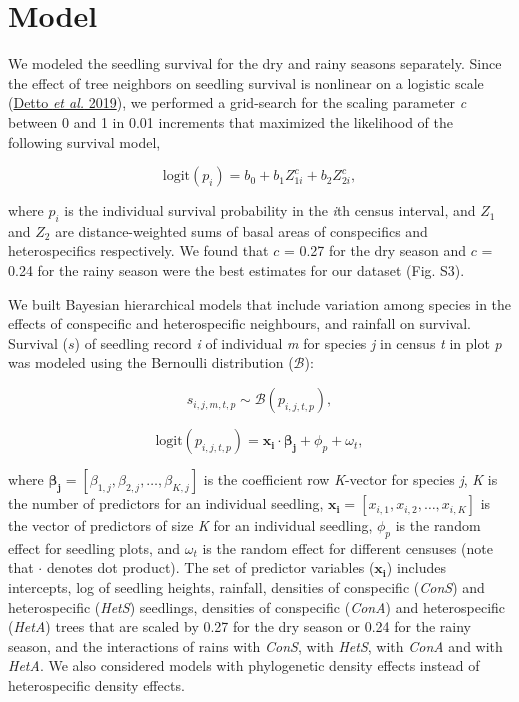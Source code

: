 \documentclass[
  12pt,
  letterpaper,
  DIV=11,
  numbers=noendperiod]{scrartcl}
\author{}
\date{}
\begin{document}
\ifdefined\Shaded\renewenvironment{Shaded}{\begin{tcolorbox}[breakable, interior hidden, borderline west={3pt}{0pt}{shadecolor}, enhanced, sharp corners, boxrule=0pt, frame hidden]}{\end{tcolorbox}}\fi

\hypertarget{model}{%
\section{Model}\label{model}}

We modeled the seedling survival for the dry and rainy seasons
separately. Since the effect of tree neighbors on seedling survival is
nonlinear on a logistic scale (\protect\hyperlink{ref-Detto2019}{Detto
\emph{et al.} 2019}), we performed a grid-search for the scaling
parameter \emph{c} between 0 and 1 in 0.01 increments that maximized the
likelihood of the following survival model,

\[
\mathrm{logit}(p_i) = b_0 + b_1 Z_{1i}^c + b_2 Z_{2i}^c,
\]

where \(p_i\) is the individual survival probability in the \emph{i}th
census interval, and \(Z_1\) and \(Z_2\) are distance-weighted sums of
basal areas of conspecifics and heterospecifics respectively. We found
that \(c\) = 0.27 for the dry season and \(c\) = 0.24 for the rainy
season were the best estimates for our dataset (Fig. S3).

We built Bayesian hierarchical models that include variation among
species in the effects of conspecific and heterospecific neighbours, and
rainfall on survival. Survival (\(s\)) of seedling record \emph{i} of
individual \emph{m} for species \emph{j} in census \emph{t} in plot
\emph{p} was modeled using the Bernoulli distribution (\(\mathcal{B}\)):

\[
s_{i,j,m,t,p} \sim \mathcal{B}(p_{i, j, t, p}),
\]

\[
\mathrm{logit}(p_{i,j,t,p}) = \boldsymbol{x_{i}} \cdot \boldsymbol{\beta_{j}} + \phi_p + \omega_t,
\]

where
\(\boldsymbol{\beta_{j}} = \left[\beta_{1,j}, \beta_{2,j}, \ldots, \beta_{K,j} \right]\)
is the coefficient row \emph{K}-vector for species \emph{j}, \emph{K} is
the number of predictors for an individual seedling,
\(\boldsymbol{x_i} = \left[x_{i,1},x _{i,2}, \ldots,x_{i,K} \right]\) is
the vector of predictors of size \emph{K} for an individual seedling,
\(\phi_p\) is the random effect for seedling plots, and \(\omega_t\) is
the random effect for different censuses (note that \(\cdot\) denotes
dot product). The set of predictor variables (\(\boldsymbol{x_i}\))
includes intercepts, log of seedling heights, rainfall, densities of
conspecific (\emph{ConS}) and heterospecific (\emph{HetS}) seedlings,
densities of conspecific (\emph{ConA}) and heterospecific (\emph{HetA})
trees that are scaled by 0.27 for the dry season or 0.24 for the rainy
season, and the interactions of rains with \emph{ConS}, with
\emph{HetS}, with \emph{ConA} and with \emph{HetA}. We also considered
models with phylogenetic density effects instead of heterospecific
density effects.
\end{document}
